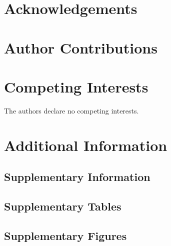 \documentclass[12pt,a4paper]{article}
\begin{document}
\section*{Acknowledgements}

\section*{Author Contributions}

\section*{Competing Interests}
The authors declare no competing interests.

\section*{Additional Information}
\subsection*{Supplementary Information}
\subsection*{Supplementary Tables}
\subsection*{Supplementary Figures}
\end{document}
